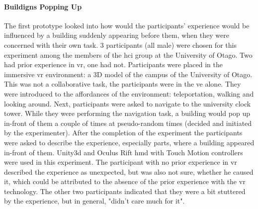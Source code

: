 \paragraph{Buildigns Popping Up} 
\label{buildingspoppingup}
The first prototype looked into how would the participants' experience would be influenced by a building suddenly appearing before them, when they were concerned with their own task.
3 participants (all male) were chosen for this experiment among the members of the \gls{hci} group at the University of Otago. Two had prior experience in \gls{vr}, one had not.
Participants were placed in the immersive \gls{vr} environment: a 3D model of the campus of the University of Otago. This was not a collaborative task, the participants were in the \gls{ve} alone. They were introduced to the affordances of the environment: teleportation, walking and looking around. Next, participants were asked to navigate to the university clock tower. While they were performing the navigation task, a building would pop up in-front of them a couple of times at pseudo-random times (decided and initiated by the experimenter). After the completion of the experiment the participants were asked to describe the experience, especially parts, where a building appeared in-front of them.
Unity3d and Oculus Rift \gls{hmd} with Touch Motion controllers were used in this experiment.
The participant with no prior experience in \gls{vr} described the experience as unexpected, but was also not sure, whether he caused it, which could be attributed to the absence of the prior experience with the \gls{vr} technology. The other two participants indicated that they were a bit stuttered by the experience, but in general, "didn't care much for it".

